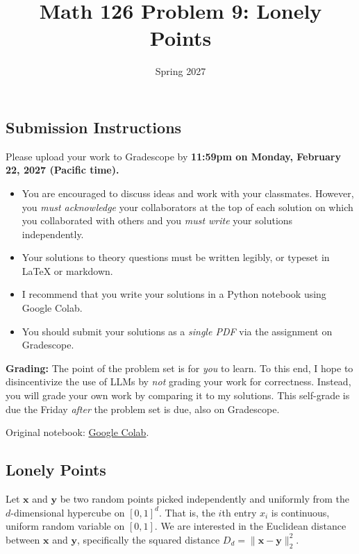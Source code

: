 \documentclass{article}
\title{Math 126 Problem 9: Lonely Points}
\author{} %
\date{Spring 2027}
\begin{document}
\maketitle

\hypertarget{submission-instructions}{%
\subsection*{Submission Instructions}\label{submission-instructions}}

Please upload your work to Gradescope by \textbf{11:59pm on Monday, February 22, 2027 (Pacific time).}

\begin{itemize}
\item
  You are encouraged to discuss ideas and work with your classmates. However, you \emph{must acknowledge} your collaborators at the top of each solution on which you collaborated with others and you \emph{must write} your solutions independently.
\item
  Your solutions to theory questions must be written legibly, or typeset in LaTeX or markdown.
\item
  I recommend that you write your solutions in a Python notebook using Google Colab.
\item
  You should submit your solutions as a \emph{single PDF} via the assignment on Gradescope.
\end{itemize}

\textbf{Grading:} The point of the problem set is for \emph{you} to learn. To this end, I hope to disincentivize the use of LLMs by \emph{not} grading your work for correctness. Instead, you will grade your own work by comparing it to my solutions. This self-grade is due the Friday \emph{after} the problem set is due, also on Gradescope.

\noindent Original notebook: \href{https://colab.research.google.com/drive/1Fyna74I7NyIELGjNG9HPTnPHmAhBt5TB?usp=sharing}{Google Colab}.

\hypertarget{lonely-points}{%
\subsection*{Lonely Points}\label{lonely-points}}

Let \(\mathbf{x}\) and \(\mathbf{y}\) be two random points picked independently and uniformly from the \(d\)-dimensional hypercube on \([0, 1]^d\). That is, the \(i\)th entry \(x_i\) is continuous, uniform random variable on \([0,1]\). We are interested in the Euclidean distance between \(\mathbf{x}\) and \(\mathbf{y}\), specifically the squared distance \(D_d = \|\mathbf{x} - \mathbf{y}\|_2^2\).
\end{document}
